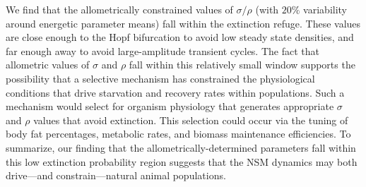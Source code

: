 \documentclass{pnastwo}
\begin{document}
\begin{article}
We find that the allometrically constrained values of $\sigma/\rho$ (with
$20\%$ variability around energetic parameter means) fall within the
extinction refuge. These values are close enough to the Hopf bifurcation to
avoid low steady state densities, and far enough away to avoid
large-amplitude transient cycles. The fact that allometric values of $\sigma$
and $\rho$ fall within this relatively small window supports the possibility
that a selective mechanism has constrained the physiological conditions that
drive starvation and recovery rates within populations.  Such a
mechanism would select for organism physiology that generates appropriate
$\sigma$ and $\rho$ values that avoid extinction.  This selection could occur
via the tuning of body fat percentages, metabolic rates, and biomass
maintenance efficiencies.
To summarize, our finding that the allometrically-determined parameters fall within this low extinction probability region suggests that the NSM dynamics may both drive---and constrain---natural animal populations.\\







\end{article}
\end{document}
